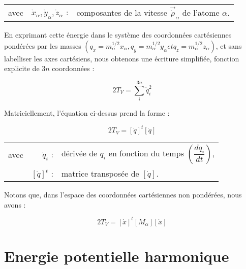 \documentclass[12pt,a4paper]{book}
\begin{document}
\begin{flushleft}
	\begin{tabular}{@{}lrp{10cm}}
		avec & $\dot{x}_{\alpha}, \dot{y}_{\alpha}, \dot{z}_{\alpha}$ : & composantes de la vitesse $\stackrel{\rightarrow}{\dot{\rho}}_{\alpha}$ de l'atome $\alpha$. 
	\end{tabular}
\end{flushleft}

En exprimant cette énergie dans le système des coordonnées cartésiennes pondérées par les masses $(q_x = m^{1/2}_{\alpha}x_{\alpha}, q_y = m^{1/2}_{\alpha}y_{\alpha} et q_z = m^{1/2}_{\alpha}z_{\alpha} )$, et sans labelliser les axes cartésiens, nous obtenons une écriture simplifiée, fonction explicite de $3n$ coordonnées :

\begin{equation}
2T_V = \sum^{3n}_i \dot{q}^2_i
\end{equation}

Matriciellement, l'équation ci-dessus prend la forme :

\begin{equation}
2T_V = \left[\dot{q}\right]^t\left[\dot{q}\right]
\end{equation}

\begin{flushleft}
	\begin{tabular}{@{}lrp{10cm}}
		avec & $\dot{q}_i$ : & dérivée de $q_{i}$ en fonction du temps $\left( \dfrac{dq_i}{dt} \right)$,\\
		& $\left[\dot{q}\right]^t$ : & matrice transposée de $\left[\dot{q}\right]$.
	\end{tabular}
\end{flushleft}

Notons que, dans l'espace des coordonnées cartésiennes non pondérées, nous avons :

\begin{equation}
2T_V = \left[\dot{x}\right]^t \left[M_{\alpha}\right] \left[\dot{x}\right]
\label{eq_nrj_cin_vib}
\end{equation}

\section{Energie potentielle harmonique}\label{E-harmonique}
\end{document}
